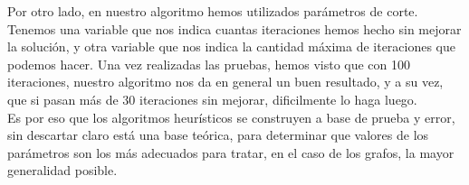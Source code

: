 \documentclass[11pt, a4paper, spanish]{article}
\begin{document}
Por otro lado, en nuestro algoritmo hemos utilizados par\'ametros de corte. Tenemos una variable que nos indica cuantas iteraciones hemos hecho sin mejorar la soluci\'on, y otra variable que nos indica la cantidad m\'axima de iteraciones que podemos hacer. Una vez realizadas las pruebas, hemos visto que con 100 iteraciones, nuestro algoritmo nos da en general un buen resultado, y a su vez, que si pasan m\'as de 30 iteraciones sin mejorar, dificilmente lo haga luego.\\

Es por eso que los algoritmos heur\'isticos se construyen a base de prueba y error, sin descartar claro est\'a una base te\'orica, para determinar que valores de los par\'ametros son los m\'as adecuados para tratar, en el caso de los grafos, la mayor generalidad posible. 
\end{document}
